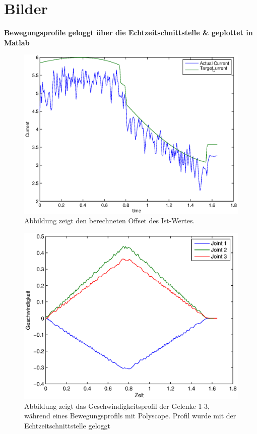 \chapter{Bilder}
\label{bewegungsprofile_anhang}

\textbf{Bewegungsprofile geloggt über die Echtzeitschnittstelle \& geplottet in Matlab}

\begin{figure}[H]
  \centering
    \includegraphics[width=1\textwidth]{pic/joint1_polyscope_current.eps}
      \caption[Soll-und Ist-Werte der Stromstärke wärend der Bewegung des 2.Gelenks mit Polyscope]{Abbildung zeigt den berechneten Offset des Ist-Wertes.}
      \label{fig:current_profile_joint1_rci}
\end{figure}

\begin{figure}[H]
  \centering
    \includegraphics[width=1\textwidth]{pic/velocity_profile_polyscope.eps}
      \caption[Geschwindigkeitsprofil wärend der Bewegung der Gelenke 1-3 mit Polyscope]{Abbildung zeigt das Geschwindigkeitsprofil der Gelenke 1-3, während eines Bewegungsprofils mit Polyscope. Profil wurde mit der Echtzeitschnittstelle geloggt}
      \label{fig:velocity_joints_rci}
\end{figure}

